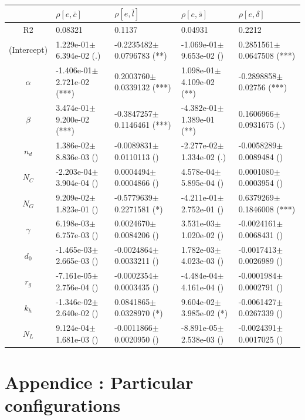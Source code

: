 \begin{center}
\begin{tabular}{|c|p{3.7cm}|p{3.7cm}|p{3.7cm}|p{3.7cm}|}
 \hline
&$\rho[e,\bar{c}]$&$\rho[e,\bar{l}]$&$\rho[e,\bar{s}]$&$\rho[e,\delta]$\\\hline
R2&0.08321&0.1137&0.04931&0.2212\\\hline
(Intercept)&1.229e-01$\pm$6.394e-02 (.)&-0.2235482$\pm$0.0796783 (**)&-1.069e-01$\pm$9.653e-02 ()&0.2851561$\pm$0.0647508 (***)\\
$\alpha$&-1.406e-01$\pm$2.721e-02 (***)&0.2003760$\pm$0.0339132 (***)&1.098e-01$\pm$4.109e-02 (**)&-0.2898858$\pm$0.02756 (***)\\
$\beta$&3.474e-01$\pm$9.200e-02 (***)&-0.3847257$\pm$0.1146461 (***)&-4.382e-01$\pm$1.389e-01 (**)&0.1606966$\pm$0.0931675 (.)\\
$n_d$&1.386e-02$\pm$8.836e-03 ()&-0.0089831$\pm$0.0110113 ()&-2.277e-02$\pm$1.334e-02 (.)&-0.0058289$\pm$0.0089484 ()\\
$N_C$&-2.203e-04$\pm$3.904e-04 ()&0.0004494$\pm$0.0004866 ()&4.578e-04$\pm$5.895e-04 ()&0.0001080$\pm$0.0003954 ()\\
$N_G$&9.209e-02$\pm$1.823e-01 ()&-0.5779639$\pm$0.2271581 (*)&-4.211e-01$\pm$2.752e-01 ()&0.6379269$\pm$0.1846008 (***)\\
$\gamma$&6.198e-03$\pm$6.757e-03 ()&0.0024670$\pm$0.0084206 ()&3.531e-03$\pm$1.020e-02 ()&-0.0024161$\pm$0.0068431 ()\\
$d_0$&-1.465e-03$\pm$2.665e-03 ()&-0.0024864$\pm$0.0033211 ()&1.782e-03$\pm$4.023e-03 ()&-0.0017413$\pm$0.0026989 ()\\
$r_g$&-7.161e-05$\pm$2.756e-04 ()&-0.0002354$\pm$0.0003435 ()&-4.484e-04$\pm$4.161e-04 ()&-0.0001984$\pm$0.0002791 ()\\
$k_h$&-1.346e-02$\pm$2.640e-02 ()&0.0841865$\pm$0.0328970 (*)&9.604e-02$\pm$3.985e-02 (*)&-0.0061427$\pm$0.0267339 ()\\
$N_L$&9.124e-04$\pm$1.681e-03 ()&-0.0011866$\pm$0.0020950 ()&-8.891e-05$\pm$2.538e-03 ()&-0.0024391$\pm$0.0017025 ()\\
\hline
\end{tabular}

\end{center}




\newpage

\section*{Appendice : Particular configurations}

